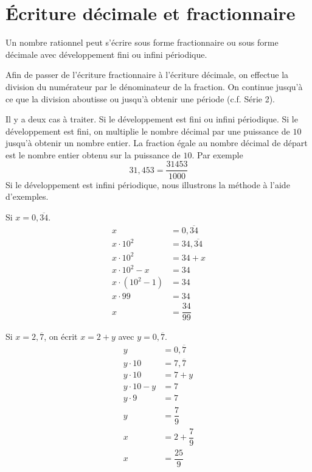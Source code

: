 \documentclass[a4paper,12pt]{report}
\begin{document}
\section{Écriture décimale et fractionnaire}
Un nombre rationnel peut s'écrire sous forme fractionnaire ou sous forme décimale avec développement fini ou infini périodique. 
\begin{technique}
	Afin de passer de l'écriture fractionnaire à l'écriture décimale, on effectue la division du numérateur par le dénominateur de la fraction.
	On continue jusqu'à ce que la division aboutisse ou jusqu'à obtenir une période (c.f. Série 2).  
\end{technique}
\begin{technique}
	Il y a deux cas à traiter. Si le développement est fini ou infini périodique.
	Si le développement est fini, on multiplie le nombre décimal par une puissance de $10$ jusqu'à obtenir un nombre entier.
	La fraction égale au nombre décimal de départ est le nombre entier obtenu sur la puissance de $10$.
	Par exemple
	\[31,453=\dfrac{31453}{1000}\]
	Si le développement est infini périodique, nous illustrons la méthode à l'aide d'exemples. 

\begin{minipage}[t]{0.25\textwidth}{
\vspace{0pt}
Si $x=0,\overline{34}$.
	\begin{align*}
		x&=0,\overline{34}\\
		x\cdot 10^2&=34,\overline{34}\\
		x\cdot 10^2&=34+x\\
		x\cdot 10^2-x&=34\\
		x\cdot (10^2-1)&=34\\
		x\cdot 99&=34\\
		x&=\dfrac{34}{99}
	\end{align*}
}
\end{minipage}
\hfill
\begin{minipage}[t]{0.3\textwidth}{
\vspace{0pt}
Si $x=2,\overline{7}$, on écrit $x=2+y$ avec $y=0,\overline{7}$.
	\begin{align*}
		y&=0,\overline{7}\\
		y\cdot 10&=7,\overline{7}\\
		y\cdot 10&=7+y\\
		y\cdot 10-y&=7\\
		y\cdot 9&=7\\
		y&=\dfrac{7}{9}\\
		x&=2+\dfrac{7}{9}\\
		x&=\dfrac{25}{9}
	\end{align*}

}
\end{minipage}
\end{technique}
\end{document}
